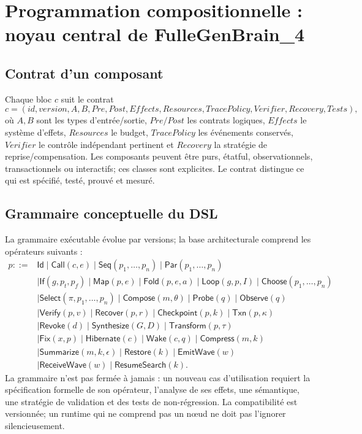 \documentclass[11pt,a4paper]{article}
\begin{document}
\section{Programmation compositionnelle : noyau central de FulleGenBrain\_4}
\subsection{Contrat d'un composant}
Chaque bloc $c$ suit le contrat
\[
c=(id,version,A,B,Pre,Post,Effects,Resources,TracePolicy,Verifier,Recovery,Tests),
\]
où $A,B$ sont les types d'entrée/sortie, $Pre/Post$ les contrats logiques, $Effects$ le système d'effets, $Resources$ le budget, $TracePolicy$ les événements conservés, $Verifier$ le contrôle indépendant pertinent et $Recovery$ la stratégie de reprise/compensation. Les composants peuvent être purs, étatful, observationnels, transactionnels ou interactifs; ces classes sont explicites. Le contrat distingue ce qui est spécifié, testé, prouvé et mesuré.

\subsection{Grammaire conceptuelle du DSL}
La grammaire exécutable évolue par versions; la base architecturale comprend les opérateurs suivants :
\begin{align*}
p ::= {}& \mathsf{Id}\mid\mathsf{Call}(c,e)\mid\mathsf{Seq}(p_1,\dots,p_n)\mid\mathsf{Par}(p_1,\dots,p_n)\\
&\mid\mathsf{If}(g,p_t,p_f)\mid\mathsf{Map}(p,e)\mid\mathsf{Fold}(p,e,a)\mid\mathsf{Loop}(g,p,I)\mid\mathsf{Choose}(p_1,\ldots,p_n)\\
&\mid\mathsf{Select}(\pi,p_1,\ldots,p_n)\mid\mathsf{Compose}(m,\theta)\mid\mathsf{Probe}(q)\mid\mathsf{Observe}(q)\\
&\mid\mathsf{Verify}(p,v)\mid\mathsf{Recover}(p,r)\mid\mathsf{Checkpoint}(p,k)\mid\mathsf{Txn}(p,\kappa)\\
&\mid\mathsf{Revoke}(d)\mid\mathsf{Synthesize}(G,D)\mid\mathsf{Transform}(p,\tau)\\
&\mid\mathsf{Fix}(x,p)\mid\mathsf{Hibernate}(c)\mid\mathsf{Wake}(c,q)\mid\mathsf{Compress}(m,k)\\
&\mid\mathsf{Summarize}(m,k,\epsilon)\mid\mathsf{Restore}(k)\mid\mathsf{EmitWave}(w)\\
&\mid\mathsf{ReceiveWave}(w)\mid\mathsf{ResumeSearch}(k).
\end{align*}
La grammaire n'est pas fermée à jamais : un nouveau cas d'utilisation requiert la spécification formelle de son opérateur, l'analyse de ses effets, une sémantique, une stratégie de validation et des tests de non-régression. La compatibilité est versionnée; un runtime qui ne comprend pas un nœud ne doit pas l'ignorer silencieusement.
\end{document}
